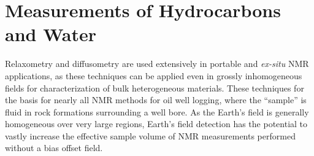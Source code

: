 \documentclass[PaulGanssle-Thesis.tex]{subfiles}
\begin{document}



\section{Measurements of Hydrocarbons and Water}
\label{relaxometry.hydrocarbons}
Relaxometry and diffusometry are used extensively in portable and \textit{ex-situ} NMR applications, as these techniques can be applied even in grossly inhomogeneous fields for characterization of bulk heterogeneous materials.\cite{hurlimann-jmr-2000,song-nmr-chemical-engineering-2006} These techniques for the basis for nearly all NMR methods for oil well logging, where the ``sample'' is fluid in rock formations surrounding a well bore. As the Earth's field is generally homogeneous over very large regions, Earth's field detection has the potential to vastly increase the effective sample volume of NMR measurements performed without a bias offset field.
\end{document}
